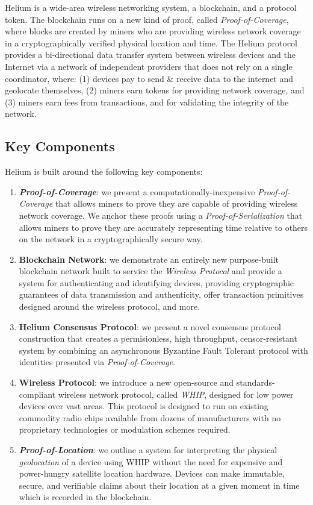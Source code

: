 \documentclass[UTF8, 10pt, nonatbib, nocopyrightspace, reprint]{sigplanconf}
\begin{document}
Helium is a wide-area wireless networking system, a blockchain, and a protocol token. The blockchain runs on a new kind of proof, called \emph{Proof-of-Coverage}, where blocks are created by miners who are providing wireless network coverage in a cryptographically verified physical location and time. The Helium protocol provides a bi-directional data transfer system between wireless devices and the Internet via a network of independent providers that does not rely on a single coordinator, where: (1) devices pay to send \& receive data to the internet and geolocate themselves, (2) miners earn tokens for providing network coverage, and (3) miners earn fees from transactions, and for validating the integrity of the network.

\subsection{Key Components}

Helium is built around the following key components:

\begin{enumerate}
  \item \textbf{\emph{Proof-of-Coverage}}: we present a computationally-inexpensive \emph{Proof-of-Coverage} that allows miners to prove they are capable of providing wireless network coverage. We anchor these proofs using a \emph{Proof-of-Serialization} that allows miners to prove they are accurately representing time relative to others on the network in a cryptographically secure way.

  \item \textbf{Blockchain Network}: we demonstrate an entirely new purpose-built blockchain network built to service the \emph{Wireless Protocol} and provide a system for authenticating and identifying devices, providing cryptographic guarantees of data transmission and authenticity, offer transaction primitives designed around the wireless protocol, and more.

  \item \textbf{Helium Consensus Protocol}: we present a novel consensus protocol construction that creates a permisionless, high throughput, censor-resistant system by combining an asynchronous Byzantine Fault Tolerant protocol with identities presented via \emph{Proof-of-Coverage}. 

  \item \textbf{Wireless Protocol}: we introduce a new open-source and standards-compliant wireless network protocol, called \emph{WHIP}, designed for low power devices over vast areas. This protocol is designed to run on existing commodity radio chips available from dozens of manufacturers with no proprietary technologies or modulation schemes required.

  \item \textbf{\emph{Proof-of-Location}}: we outline a system for interpreting the physical \emph{geolocation} of a device using WHIP without the need for expensive and power-hungry satellite location hardware. Devices can make immutable, secure, and verifiable claims about their location at a given moment in time which is recorded in the blockchain.
\end{enumerate}
\end{document}
